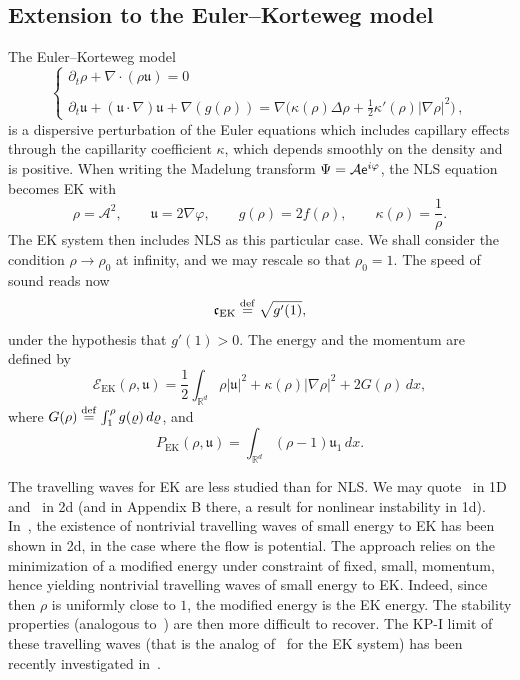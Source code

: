 \documentclass[10pt]{amsart}
\theoremstyle{definition}\newtheorem{defi}[theo]{Definition}\newtheorem{rema}[theo]{Remark}\newtheorem{exam}[theo]{Example}\newtheorem{exem}[theo]{Example}\newtheorem{nota}[theo]{Notation}
\newcommand*\p{\partial}
\newcommand*\R{\mathbb R}
\newcommand*\ddef{\stackrel{\rm def}{=}}
\newcommand{\EK}{\mathrm{EK}}
\newcommand*\BE{\mathcal{E}}
\newcommand*\BA{\mathcal{A}}
\newcommand*\ds{\displaystyle}
\newcommand*\ex{{\sf e}}
\newcommand*\cs{{\mathfrak c}}
\renewcommand*\u{\mathfrak{u}}
\newcommand*\vp{\varphi}
\begin{document}
\subsection{Extension to the Euler--Korteweg model}

The Euler--Korteweg model
\begin{equation}
\tag{EK}
\begin{cases}
\ds{ \p_t \rho + \nabla \cdot (\rho \u) } = 0 \\ \ \\
\ds{ \p_{t} \u + (\u \cdot \nabla) \u + \nabla (g (\rho)) = \nabla \Big(\kappa(\rho) \Delta \rho + \frac12 \kappa'(\rho) |\nabla \rho |^2 \Big) } \,,
\end{cases}
\end{equation}
is a dispersive perturbation of the Euler equations which includes capillary effects through the capillarity coefficient $ \kappa $, which depends smoothly on the density and is positive. When writing the Madelung transform $ \Psi = \BA \ex^{ i \vp } $, the NLS equation becomes EK with
\[
\rho = \BA^2,
\quad \quad
\u = 2 \nabla \vp,
\quad \quad g(\rho) = 2 f(\rho),
\quad \quad
\kappa(\rho) = \frac{1}{ \rho }.
\]
The EK system then includes NLS as this particular case. We shall consider the condition $ \rho \to \rho_0 $ at infinity, and we may rescale so that $ \rho_0 = 1 $. The speed of sound reads now
\[
\cs_{\EK} \ddef\sqrt{ g'(1) },
\]
under the hypothesis that $ g'(1) > 0 $. The energy and the momentum are defined by
\[
\BE_{\EK} (\rho, \u) = \frac{1}{2} \int_{\R^d} \rho \lvert \u \rvert^2 + \kappa (\rho) \lvert \nabla \rho \rvert^2 + 2 G(\rho) \, dx,
\]
where $ G(\rho) \ddef \int_1^\rho g(\varrho) \, d \varrho $, and
\[
P_{\EK} (\rho, \u) = \int_{\R^d} (\rho -1) \u_1 \, dx.
\]

The travelling waves for EK are less studied than for NLS. We may quote~\cite{Ben_TWEK} in 1D and~\cite{Audiard_OP-TW} in 2d (and in Appendix B there, a result for nonlinear instability in 1d). In~\cite{Audiard_OP-TW}, the existence of nontrivial travelling waves of small energy to EK has been shown in 2d, in the case where the flow is potential. The approach relies on the minimization of a modified energy under constraint of fixed, small, momentum, hence yielding nontrivial travelling waves of small energy to EK. Indeed, since then $ \rho $ is uniformly close to $1 $, the modified energy is the EK energy. The stability properties (analogous to~\cite{CM1}) are then more difficult to recover. The KP-I limit of these travelling waves (that is the analog of~\cite{BGStranso2d} for the EK system) has been recently investigated in~\cite{Vassenet}.
\end{document}
